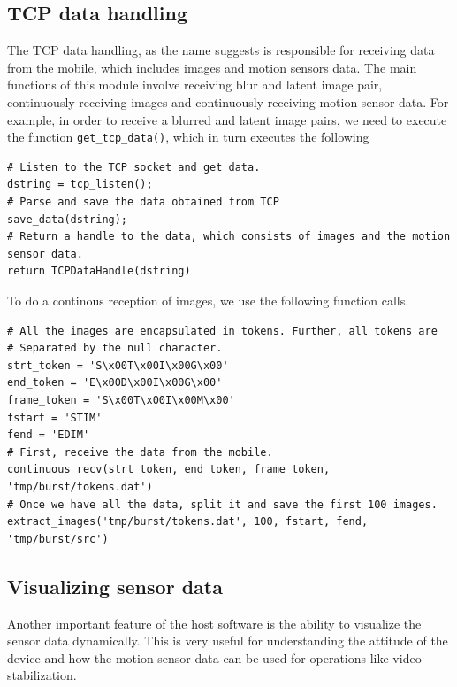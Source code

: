 \documentclass[BTech]{iitmdiss}
\begin{document}
\subsection{TCP data handling}
\label{device:host:tcp}
The TCP data handling, as the name suggests is responsible for receiving
data from the mobile, which includes images and motion sensors data. The
main functions of this module involve receiving blur and latent image 
pair, continuously receiving images and continuously receiving motion
sensor data. For example, in order to receive a blurred and latent image
pairs, we need to execute the function \verb|get_tcp_data()|, which
in turn executes the following

\begin{singlespacing}
\begin{lstlisting}[style=pylisting]
# Listen to the TCP socket and get data.
dstring = tcp_listen();
# Parse and save the data obtained from TCP		
save_data(dstring);			
# Return a handle to the data, which consists of images and the motion sensor data.
return TCPDataHandle(dstring) 
\end{lstlisting}
\end{singlespacing}

To do a continous reception of images, we use the following function 
calls.

\begin{singlespacing}
\begin{lstlisting}[style=pylisting]
# All the images are encapsulated in tokens. Further, all tokens are
# Separated by the null character.
strt_token = 'S\x00T\x00I\x00G\x00'
end_token = 'E\x00D\x00I\x00G\x00'
frame_token = 'S\x00T\x00I\x00M\x00'
fstart = 'STIM'
fend = 'EDIM'
# First, receive the data from the mobile.
continuous_recv(strt_token, end_token, frame_token, 'tmp/burst/tokens.dat')
# Once we have all the data, split it and save the first 100 images.
extract_images('tmp/burst/tokens.dat', 100, fstart, fend, 'tmp/burst/src')
\end{lstlisting}
\end{singlespacing}

\subsection{Visualizing sensor data}
\label{device:host:visu}
Another important feature of the host software is the ability to visualize
the sensor data dynamically. This is very useful for understanding the
attitude of the device and how the motion sensor data can be used for
operations like video stabilization. 
\end{document}
